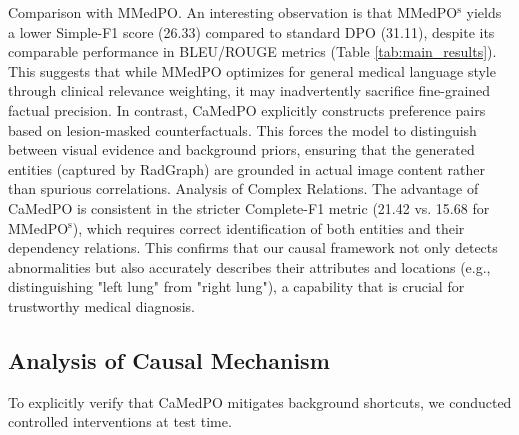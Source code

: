 \begin{table}[t]
    \centering
    \caption{RadGraph F1 scores on IU-Xray dataset.}
    \label{tab:radgraph}
\end{table}

Comparison with MMedPO. An interesting observation is that MMedPO$^{\mathrm{s}}$ yields a lower Simple-F1 score (26.33) compared to standard DPO (31.11), despite its comparable performance in BLEU/ROUGE metrics (Table \ref{tab:main_results}). This suggests that while MMedPO optimizes for general medical language style through clinical relevance weighting, it may inadvertently sacrifice fine-grained factual precision. In contrast, CaMedPO explicitly constructs preference pairs based on lesion-masked counterfactuals. This forces the model to distinguish between visual evidence and background priors, ensuring that the generated entities (captured by RadGraph) are grounded in actual image content rather than spurious correlations.
Analysis of Complex Relations. The advantage of CaMedPO is consistent in the stricter Complete-F1 metric (21.42 vs. 15.68 for MMedPO$^{\mathrm{s}}$), which requires correct identification of both entities and their dependency relations. This confirms that our causal framework not only detects abnormalities but also accurately describes their attributes and locations (e.g., distinguishing "left lung" from "right lung"), a capability that is crucial for trustworthy medical diagnosis.

\subsection{Analysis of Causal Mechanism}

To explicitly verify that CaMedPO mitigates background shortcuts, we conducted controlled interventions at test time.

